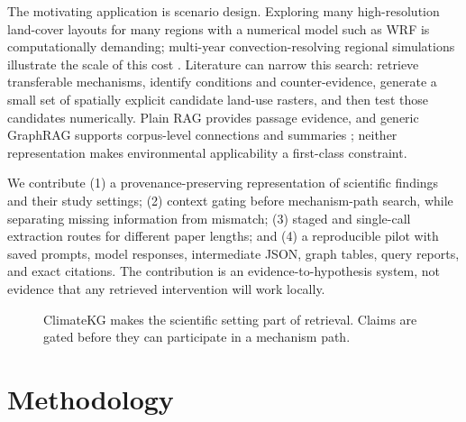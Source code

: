 \documentclass{article}
\newcommand{\system}{ClimateKG}
\begin{document}
The motivating application is scenario design. Exploring many high-resolution land-cover layouts for many regions with a numerical model such as WRF \citep{skamarock2019} is computationally demanding; multi-year convection-resolving regional simulations illustrate the scale of this cost \citep{leutwyler2017}. Literature can narrow this search: retrieve transferable mechanisms, identify conditions and counter-evidence, generate a small set of spatially explicit candidate land-use rasters, and then test those candidates numerically. Plain RAG \citep{lewis2020} provides passage evidence, and generic GraphRAG supports corpus-level connections and summaries \citep{edge2024}; neither representation makes environmental applicability a first-class constraint.

We contribute (1) a provenance-preserving representation of scientific findings and their study settings; (2) context gating before mechanism-path search, while separating missing information from mismatch; (3) staged and single-call extraction routes for different paper lengths; and (4) a reproducible pilot with saved prompts, model responses, intermediate JSON, graph tables, query reports, and exact citations. The contribution is an evidence-to-hypothesis system, not evidence that any retrieved intervention will work locally.

\begin{figure}[t]
\centering
{}
\caption{\system{} makes the scientific setting part of retrieval. Claims are gated before they can participate in a mechanism path.}
\label{fig:pipeline}
\end{figure}

\section{Methodology}
\end{document}
